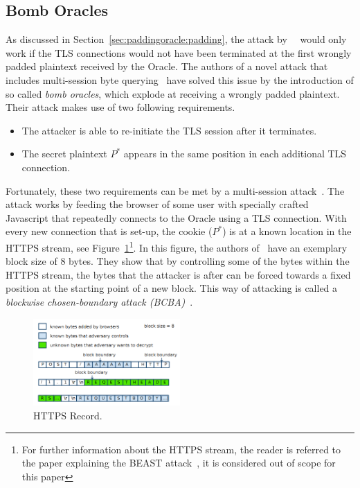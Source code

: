 \documentclass[10pt,conference,a4paper]{IEEEtran}
\begin{document}
\subsection{Bomb Oracles}
\label{sec:paddingoracle:bomb}
As discussed in Section~\ref{sec:paddingoracle:padding}, the attack by~\citeauthor{vaudenay2002security}~\cite{vaudenay2002security} would only work if the TLS connections would not have been terminated at the first wrongly padded plaintext received by the Oracle. The authors of a novel attack that includes multi-session byte querying~\cite{canvel2003password} have solved this issue by the introduction of so called \textit{bomb oracles}, which explode at receiving a wrongly padded plaintext. Their attack makes use of two following requirements.
\begin{itemize}
	\item The attacker is able to re-initiate the TLS session after it terminates.
	\item The secret plaintext $P^{*}$ appears in the same position in each additional TLS connection.
\end{itemize}
Fortunately, these two requirements can be met by a multi-session attack~\cite{vaudenay2002security}. The attack works by feeding the browser of some user with specially crafted Javascript that repeatedly connects to the Oracle using a TLS connection. With every new connection that is set-up, the cookie ($P^{*}$) is at a known location in the HTTPS stream, see Figure~\ref{fig:beast_http}\footnote{For further information about the HTTPS stream, the reader is referred to the paper explaining the BEAST attack~\cite{duong2011here}, it is considered out of scope for this paper}. In this figure, the authors of~\cite{duong2011here} have an exemplary block size of 8 bytes. They show that by controlling some of the bytes within the HTTPS stream, the bytes that the attacker is after can be forced towards a fixed position at the starting point of a new block.  This way of attacking is called a \textit{blockwise chosen-boundary attack (BCBA)}~\cite{duong2011here}.

\begin{figure}[h]
	\centering
	\includegraphics[width=0.5\textwidth]{beast_https.png}
	\caption{HTTPS Record.~\cite{duong2011here}}
	\label{fig:beast_http}
\end{figure}
\end{document}
